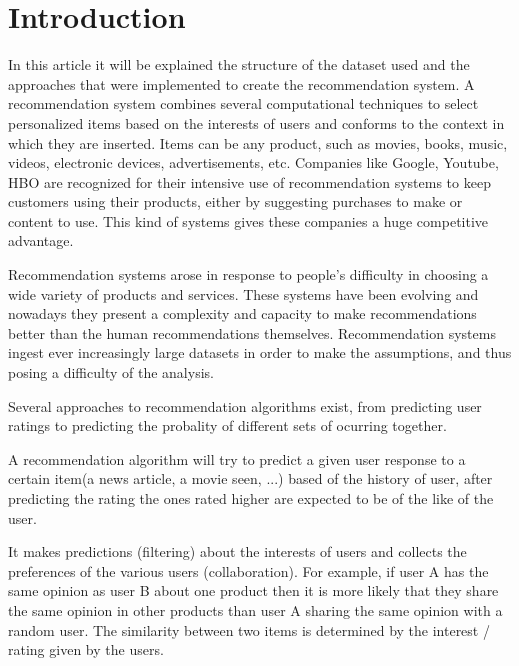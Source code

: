 \section{Introduction}
\label{intro}
In this article it will be explained the structure of the dataset used and the approaches that
were implemented to create the recommendation system.
A recommendation system combines several computational techniques to select personalized items based on the
interests of users and conforms to the context in which they are inserted.
Items can be any product, such as movies, books, music, videos, electronic devices, advertisements, etc.
Companies like Google, Youtube, HBO are recognized for their intensive use of recommendation systems to 
keep customers using their products, either by suggesting  purchases to make or content to use.
This kind of systems gives these companies a huge competitive advantage.

Recommendation systems arose in response to people's difficulty in choosing a wide variety of products and services.
These systems have been evolving and nowadays they present a complexity and capacity to make recommendations better
than the human recommendations themselves. Recommendation systems ingest ever increasingly large datasets in 
order to make the assumptions, and thus posing a difficulty of the analysis.

Several approaches to recommendation algorithms exist, from predicting user ratings to predicting the probality
of different sets of ocurring together.


A recommendation algorithm will try to predict a given user response to a certain item(a news article, a movie seen, ...)
based of the history of user, after predicting the rating the ones rated higher are expected to be of the like
of the user.

It makes predictions (filtering) about the interests of users and collects the preferences of the various users (collaboration).
For example, if user A has the same opinion as user B about one product then it is more likely that they share
the same opinion in other products than user A sharing the same opinion with a random user.
The similarity between two items is determined by the interest / rating given by the users.